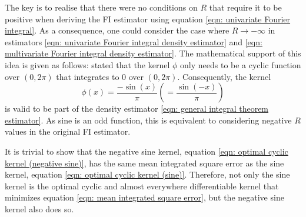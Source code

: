\documentclass[%
 reprint,
 amsmath,amssymb,
 aps,
]{revtex4-2}
\begin{document}
The key is to realise that there were no conditions on $R$ that require it to be positive when deriving the FI estimator using equation \eqref{eqn: univariate Fourier integral}. As a consequence, one could consider the case where $R \to -\infty$ in estimators \eqref{eqn: univariate Fourier integral density estimator} and \eqref{eqn: multivariate Fourier integral density estimator}. The mathematical support of this idea is given as follows: \cite{ho2021integral} stated that the kernel $\phi$ only needs to be a cyclic function over $(0, 2\pi)$ that integrates to 0 over $(0, 2\pi)$. Consequently, the kernel
\begin{equation} \label{eqn: optimal cyclic kernel (negative sine)}
    \phi(x) = \frac{-\sin(x)}{\pi} \left(= \frac{\sin(-x)}{\pi}\right)
\end{equation}
is valid to be part of the density estimator \eqref{eqn: general integral theorem estimator}. As sine is an odd function, this is equivalent to considering negative $R$ values in the original FI estimator.

It is trivial to show that the negative sine kernel, equation \eqref{eqn: optimal cyclic kernel (negative sine)}, has the same mean integrated square error as the sine kernel, equation \eqref{eqn: optimal cyclic kernel (sine)}. Therefore, not only the sine kernel is the optimal cyclic and almost everywhere differentiable kernel that minimizes equation \eqref{eqn: mean integrated square error}, but the negative sine kernel also does so.
\end{document}
